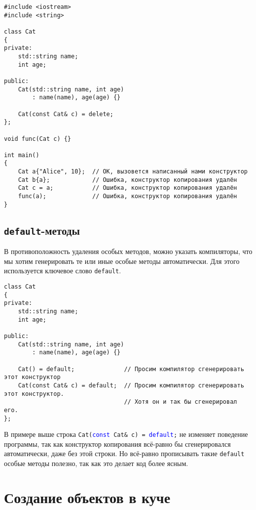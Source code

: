 \documentclass{article}
\begin{document}
\begin{lstlisting}
#include <iostream>
#include <string>

class Cat
{
private:
	std::string name;
	int age;
	
public:
	Cat(std::string name, int age) 
		: name(name), age(age) {}
		
	Cat(const Cat& c) = delete;
};

void func(Cat c) {}

int main()
{
	Cat a{"Alice", 10};  // OK, вызовется написанный нами конструктор
	Cat b{a};            // Ошибка, конструктор копирования удалён
	Cat c = a;           // Ошибка, конструктор копирования удалён
	func(a);             // Ошибка, конструктор копирования удалён
}
\end{lstlisting}

\subsection*{\texttt{default}-методы}
В противоположность удаления особых методов, можно указать компиляторы, что мы хотим генерировать те или иные особые методы автоматически. Для этого используется ключевое слово \texttt{default}.
\begin{lstlisting}
class Cat
{
private:
	std::string name;
	int age;
	
public:
	Cat(std::string name, int age) 
		: name(name), age(age) {}
		
	Cat() = default;			  // Просим компилятор сгенерировать этот конструктор
	Cat(const Cat& c) = default;  // Просим компилятор сгенерировать этот конструктор.
	                              // Хотя он и так бы сгенерировал его.
};
\end{lstlisting}
В примере выше строка \texttt{Cat(\textcolor{blue}{const} Cat\& c) = \textcolor{blue}{default};} не изменяет поведение программы, так как конструктор копирования всё-равно бы сгенерировался автоматически, даже без этой строки. Но всё-равно прописывать такие \texttt{default} особые методы полезно, так как это делает код более ясным. 

\section*{Создание объектов в куче}
\end{document}
